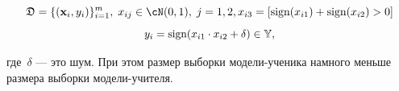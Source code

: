 \documentclass[12pt, twoside]{article}
\begin{document}
$$\fD = \{(\bx_i, y_i)\}_{i=1}^{m},\; x_{ij} \in \cN(0, 1),\; j=1, 2, x_{i3} = [\text{sign}(x_{i1})+\text{sign}(x_{i2})>0]$$
$$y_i = \text{sign}(x_{i1}\cdot x_{i2}+\delta) \in \bbY,$$

\noindent
где~$\delta$ --- это шум. При этом размер выборки модели-ученика намного меньше размера выборки модели-учителя.


\begin{figure}[!ht]
\begin{minipage}[h]{0.5\linewidth}
\end{minipage}
\begin{minipage}[h]{0.5\linewidth}

\end{minipage}
\end{figure}
\end{document}

